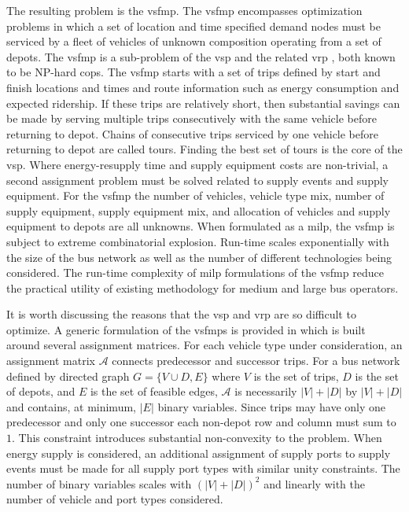 The resulting problem is the \gls{vsfmp}. The \gls{vsfmp} encompasses optimization problems in which a set of location and time specified demand nodes must be serviced by a fleet of vehicles of unknown composition operating from a set of depots. The \gls{vsfmp} is a sub-problem of the \gls{vsp} \cite{Bunte_2009_PT} and the related \gls{vrp} \cite{Konstantakopoulos_2022_OR, Sabet_2022_IA}, both known to be NP-hard \glspl{cop}. The \gls{vsfmp} starts with a set of trips defined by start and finish locations and times and route information such as energy consumption and expected ridership. If these trips are relatively short, then substantial savings can be made by serving multiple trips consecutively with the same vehicle before returning to depot. Chains of consecutive trips serviced by one vehicle before returning to depot are called tours. Finding the best set of tours is the core of the \gls{vsp}. Where energy-resupply time and supply equipment costs are non-trivial, a second assignment problem must be solved related to supply events and supply equipment. For the \gls{vsfmp} the number of vehicles, vehicle type mix, number of supply equipment, supply equipment mix, and allocation of vehicles and supply equipment to depots are all unknowns. When formulated as a \gls{milp}, the \gls{vsfmp} is subject to extreme combinatorial explosion. Run-time scales exponentially with the size of the bus network as well as the number of different technologies being considered. The run-time complexity of \gls{milp} formulations of the \gls{vsfmp} reduce the practical utility of existing methodology for medium and large bus operators.

It is worth discussing the reasons that the \gls{vsp} and \gls{vrp} are so difficult to optimize. A generic formulation of the \glspl{vsfmp} is provided in \cite{Rogge_2018_AE} which is built around several assignment matrices. For each vehicle type under consideration, an assignment matrix $\mathcal{A}$ connects predecessor and successor trips. For a bus network defined by directed graph $G = \{V \cup D, E\}$ where $V$ is the set of trips, $D$ is the set of depots, and $E$ is the set of feasible edges, $\mathcal{A}$ is necessarily $|V| + |D|$ by $|V| + |D|$ and contains, at minimum, $|E|$ binary variables. Since trips may have only one predecessor and only one successor each non-depot row and column must sum to $1$. This constraint introduces substantial non-convexity to the problem. When energy supply is considered, an additional assignment of supply ports to supply events must be made for all supply port types with similar unity constraints. The number of binary variables scales with $(|V| + |D|)^2$ and linearly with the number of vehicle and port types considered.

